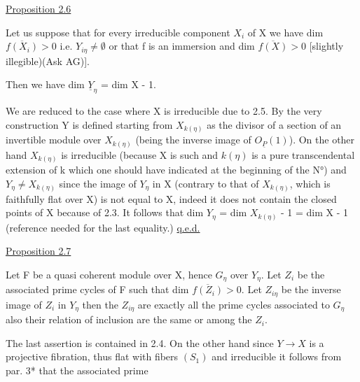 
\uline{Proposition 2.6}

Let us suppose that for every irreducible component $X_i$ of X
we have dim $\overline{f(X_i)} > 0$ i.e. $Y_{i\eta} \neq \emptyset$ or that f is an immersion and
dim $\overline{f(X)} > 0$ [slightly illegible)(Ask AG)].

Then we have dim $\underline{Y}_\eta$ = dim X - 1.

We are reduced to the case where X is irreducible due to 2.5.
By the very construction Y is defined starting from $X_{k(\eta)}$ as the
divisor of a section of an invertible module over $X_{k(\eta)}$ (being the
inverse image of $O_{\underline{P}}(1)$).  On the other hand $X_{k(\eta)}$ is irreducible
(because X is such and $k(\eta)$ is a pure transcendental extension of
k which one should have indicated at the beginning of the N°) and
$Y_\eta \neq X_{k(\eta)}$ since the image of $Y_\eta$ in X (contrary to that of $X_{k(\eta)}$,
which is faithfully flat over X) is not equal to X, indeed it does
not contain the closed points of X because of 2.3.  It follows
that dim $Y_\eta$ = dim $X_{k(\eta)}$ - 1 = dim X - 1 (reference needed for the
last equality.) \uline{q.e.d.}

\uline{Proposition 2.7}

Let F be a quasi coherent module over X, hence $G_\eta$ over $Y_\eta$.
Let $Z_i$ be the associated prime cycles of F such that dim $\overline{f(Z_i)} > 0$.
Let $Z_{i\eta}$ be the inverse image of $Z_i$ in $Y_\eta$ then the $Z_{i\eta}$ are exactly
all the prime cycles associated to $G_\eta$ also their relation of
inclusion are the same or among the $Z_i$.

The last assertion is contained in 2.4.  On the other hand
since $Y \to X$ is a projective fibration, thus flat with fibers $(S_1)$
and irreducible it follows from par. 3* that the associated prime

